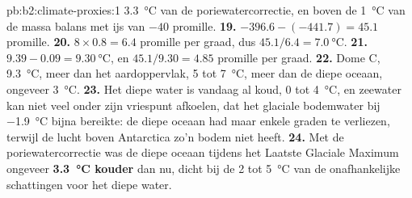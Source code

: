 \begin{solution}{pb:b2:climate-proxies:1}
\qty{3.3}{\celsius} van de poriewatercorrectie, en boven de \qty{1}{\celsius} van de massa%
balans met ijs van $-40$ promille.
\textbf{19.} $-396.6 - (-441.7) = 45.1$ promille.
\textbf{20.} $8 \times 0.8 = 6.4$ promille per graad, dus $45.1/6.4 = \qty{7.0}{\celsius}$.
\textbf{21.} $9.39 - 0.09 = \qty{9.30}{\celsius}$, en $45.1/9.30 = 4.85$ promille per graad.
\textbf{22.} Dome C, \qty{9.3}{\celsius}, meer dan het aardoppervlak, 5 tot \qty{7}{\celsius}, meer
dan de diepe oceaan, ongeveer \qty{3}{\celsius}.
\textbf{23.} Het diepe water is vandaag al koud, 0 tot \qty{4}{\celsius}, en zeewater kan niet
veel onder zijn vriespunt afkoelen, dat het glaciale bodemwater bij \qty{-1.9}{\celsius} bijna
bereikte: de diepe oceaan had maar enkele graden te verliezen, terwijl de lucht boven Antarctica
zo'n bodem niet heeft.
\textbf{24.} Met de poriewatercorrectie was de diepe oceaan tijdens het Laatste Glaciale Maximum ongeveer
\textbf{\qty{3.3}{\celsius} kouder} dan nu, dicht bij de 2 tot \qty{5}{\celsius} van de
onafhankelijke schattingen voor het diepe water.
\end{solution}
